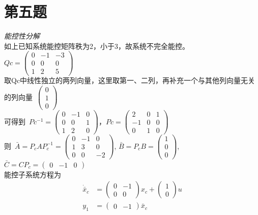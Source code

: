 \documentclass[a4paper]{article}
\begin{document}
\section*{第五题}
\emph{能控性分解}\\
如上已知系统能控矩阵秩为2，小于3，故系统不完全能控。\\
$Qc= \left(\begin{array}{ccc} 0 & -1 & -3\\ 0 & 0 & 0\\ 1 & 2 & 5 \end{array}\right) $ \\
\mbox{取Qc中线性独立的两列向量，这里取第一、二列，再补充一个与其他列向量无关的列向量 }$\left(\begin{array}{c} 0\\ 1\\ 0 \end{array}\right)$ \\
\mbox{可得到 }$Pc^{-1}=\left(\begin{array}{ccc} 0 & -1 & 0\\ 0 & 0 & 1\\ 1 & 2 & 0 \end{array}\right)$，$Pc=\left(\begin{array}{ccc} 2 & 0 & 1\\ -1 & 0 & 0\\ 0 & 1 & 0 \end{array}\right)$ \\
\mbox{则 }$ \bar{A} =P_{c}AP_{c}^{-1}= \left(\begin{array}{ccc} 0 & -1 & 0\\ 1 & 3 & 0\\ 0 & 0 & -2 \end{array}\right)$,
$ \bar{B} =P_{c}B=\left(\begin{array}{c} 1\\ 0\\ 0 \end{array}\right)$,
$ \bar{C} =CP_{c}=\left(\begin{array}{ccc} 0 & -1 & 0 \end{array}\right)$
\noindent \\
能控子系统方程为
\begin{align*}
\dot{\bar{x}}_{c} &=  \left(\begin{array}{cc} 0 & -1\\ 0 & 0 \end{array}\right)x_{c}+\left(\begin{array}{c} 1\\ 0 \end{array}\right)u \\ 
y_{1} &= \left(\begin{array}{cc} 0 & -1 \end{array}\right)\bar{x}_{c}
\end{align*}
\end{document}
